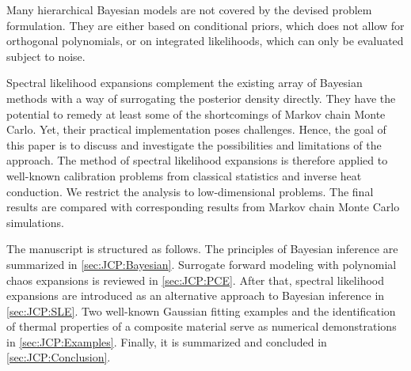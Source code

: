 Many hierarchical Bayesian models \cite{Nagel:JAIS2015,Nagel:PEM2016} are not covered by the devised problem formulation.
They are either based on conditional priors, which does not allow for orthogonal polynomials, or on integrated likelihoods, which can only be evaluated subject to noise.
\par %
Spectral likelihood expansions complement the existing array of Bayesian methods with a way of surrogating the posterior density directly.
They have the potential to remedy at least some of the shortcomings of Markov chain Monte Carlo.
Yet, their practical implementation poses challenges.
Hence, the goal of this paper is to discuss and investigate the possibilities and limitations of the approach.
The method of spectral likelihood expansions is therefore applied to well-known calibration problems from classical statistics and inverse heat conduction.
We restrict the analysis to low-dimensional problems.
The final results are compared with corresponding results from Markov chain Monte Carlo simulations.
\par %
The manuscript is structured as follows.
The principles of Bayesian inference are summarized in \cref{sec:JCP:Bayesian}.
Surrogate forward modeling with polynomial chaos expansions is reviewed in \cref{sec:JCP:PCE}.
After that, spectral likelihood expansions are introduced as an alternative approach to Bayesian inference in \cref{sec:JCP:SLE}.
Two well-known Gaussian fitting examples and the identification of thermal properties of a composite material serve as numerical demonstrations in \cref{sec:JCP:Examples}.
Finally, it is summarized and concluded in \cref{sec:JCP:Conclusion}.
